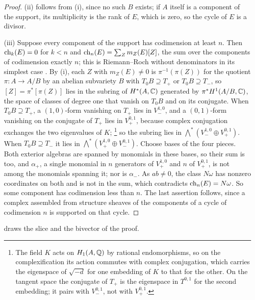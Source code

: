 \begin{proof}
(ii) follows from (i), since no such $B$ exists; if $A$ itself is a
component of the support, its multiplicity is the rank of $E$, which is zero,
so the cycle of $E$ is a divisor.

(iii) Suppose every component of the support has codimension at least $n$.
Then $\operatorname{ch}_{k}(E)=0$ for $k<n$ and $\operatorname{ch}_{n}(E)=\sum_{Z}m_{Z}(E)[Z]$, the sum
over the components of codimension exactly $n$; this is Riemann--Roch without
denominators in its simplest case \cite[Chapter~15]{Ful98}. By (i), each $Z$
with $m_{Z}(E)\ne0$ is $\pi^{-1}(\pi(Z))$ for the quotient $\pi\colon A\to A/B$
by an abelian subvariety $B$ with $T_{0}B\supseteq T_{+}$ or
$T_{0}B\supseteq T_{-}$, so $[Z]=\pi^{*}[\pi(Z)]$ lies in the subring of
$H^{*}(A,\mathbb{C})$ generated by $\pi^{*}H^{1}(A/B,\mathbb{C})$, the space of classes of
degree one that vanish on $T_{0}B$ and on its conjugate. When
$T_{0}B\supseteq T_{+}$, a
$(1,0)$-form vanishing on $T_{+}$ lies in $V_{-}^{1,0}$, and a $(0,1)$-form
vanishing on the conjugate of $T_{+}$ lies in $V_{+}^{0,1}$, because complex
conjugation exchanges the two eigenvalues of $K$;%
\footnote{The field $K$ acts on $H_{1}(A,\mathbb{Q})$ by rational endomorphisms, so
on the complexification its action commutes with complex conjugation, which
carries the eigenspace of $\sqrt{-d}$ for one embedding of $K$ to that for the
other. On the tangent space the conjugate of $T_{+}$ is the eigenspace in
$T^{0,1}$ for the second embedding; it pairs with $V_{-}^{0,1}$, not with
$V_{+}^{0,1}$.}
so the subring lies in $\bigwedge^{*}(V_{-}^{1,0}\oplus V_{+}^{0,1})$. When
$T_{0}B\supseteq T_{-}$ it lies in $\bigwedge^{*}(V_{+}^{1,0}\oplus
V_{-}^{0,1})$. Choose bases of the four pieces. Both exterior algebras are
spanned by monomials in these bases, so their sum is too, and $\alpha_{+}$, a
single monomial in $n$ generators of $V_{+}^{1,0}$ and $n$ of $V_{+}^{0,1}$,
is not among the monomials spanning it; nor is $\alpha_{-}$. As $ab\ne0$, the
class $N\omega$ has nonzero coordinates on both and is not in the sum, which
contradicts $\operatorname{ch}_{n}(E)=N\omega$. So some component has codimension less
than $n$. The last assertion follows, since a complex assembled from
structure sheaves of the components of a cycle of codimension $n$ is
supported on that cycle.
\end{proof}

 draws the slice and the bivector of the proof.

